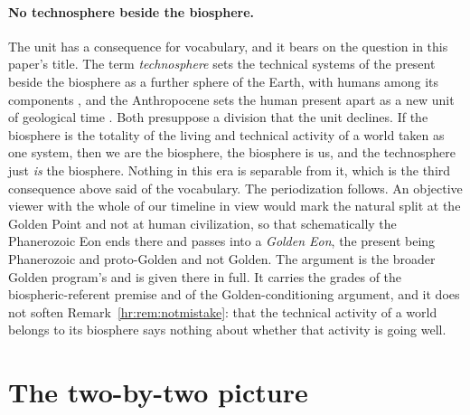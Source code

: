 \paragraph{No technosphere beside the biosphere.}\label{hr:rem:technosphere}
The unit has a consequence for vocabulary, and it bears on the question
in this paper's title. The term \emph{technosphere} sets the technical
systems of the present beside the biosphere as a further sphere of the
Earth, with humans among its components \cite{Haff14}, and the
Anthropocene sets the human present apart as a new unit of geological
time \cite{Crutzen02}. Both presuppose a division that the unit
declines. If the biosphere is the totality of the living and technical
activity of a world taken as one system, then we are the biosphere, the
biosphere is us, and the technosphere just \emph{is} the biosphere.
Nothing in this era is separable from it, which is the third
consequence above said of the vocabulary. The periodization follows. An
objective viewer with the whole of our timeline in view would mark the
natural split at the Golden Point and not at human civilization, so
that schematically the Phanerozoic Eon ends there and passes into a
\emph{Golden Eon}, the present being Phanerozoic and proto-Golden and
not Golden. The argument is the broader Golden program's and is given
there in full. It carries the grades of the biospheric-referent premise
and of the Golden-conditioning argument, and it does not soften
Remark~\ref{hr:rem:notmistake}: that the technical activity of a world
belongs to its biosphere says nothing about whether that activity is
going well.


\section{The two-by-two picture}\label{sec:table}

